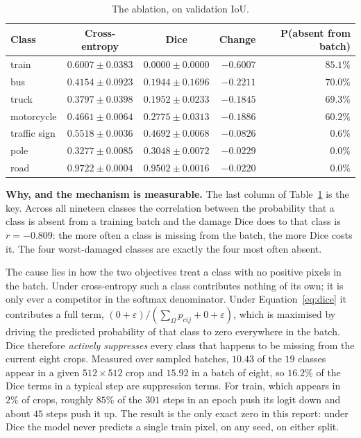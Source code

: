\begin{table}[H]
\centering
\caption{The ablation, on validation IoU.}
\label{tab:ablation}
\small
\begin{tabular}{lccrr}
\hline
\textbf{Class} & \textbf{Cross-entropy} & \textbf{Dice} & \textbf{Change} & \textbf{P(absent from batch)} \\
\hline
train         & $0.6007 \pm 0.0383$ & $0.0000 \pm 0.0000$ & $-0.6007$ & $85.1\%$ \\
bus           & $0.4154 \pm 0.0923$ & $0.1944 \pm 0.1696$ & $-0.2211$ & $70.0\%$ \\
truck         & $0.3797 \pm 0.0398$ & $0.1952 \pm 0.0233$ & $-0.1845$ & $69.3\%$ \\
motorcycle    & $0.4661 \pm 0.0064$ & $0.2775 \pm 0.0313$ & $-0.1886$ & $60.2\%$ \\
\hline
traffic sign  & $0.5518 \pm 0.0036$ & $0.4692 \pm 0.0068$ & $-0.0826$ & $0.6\%$ \\
pole          & $0.3277 \pm 0.0085$ & $0.3048 \pm 0.0072$ & $-0.0229$ & $0.0\%$ \\
road          & $0.9722 \pm 0.0004$ & $0.9502 \pm 0.0016$ & $-0.0220$ & $0.0\%$ \\
\hline
\end{tabular}
\end{table}

\textbf{Why, and the mechanism is measurable.} The last column of Table~\ref{tab:ablation} is
the key. Across all nineteen classes the correlation between the probability that a class is
absent from a training batch and the damage Dice does to that class is $r = -0.809$: the more
often a class is missing from the batch, the more Dice costs it. The four worst-damaged classes
are exactly the four most often absent.

The cause lies in how the two objectives treat a class with no positive pixels in the batch.
Under cross-entropy such a class contributes nothing of its own; it is only ever a competitor in
the softmax denominator. Under Equation~\ref{eq:dice} it contributes a full term,
$(0 + \varepsilon) / (\sum_\Omega p_{cij} + 0 + \varepsilon)$, which is maximised by driving the
predicted probability of that class to zero everywhere in the batch. Dice therefore \emph{actively
suppresses} every class that happens to be missing from the current eight crops. Measured over
sampled batches, $10.43$ of the $19$ classes appear in a given $512 \times 512$ crop and $15.92$
in a batch of eight, so $16.2\%$ of the Dice terms in a typical step are suppression terms. For
train, which appears in $2\%$ of crops, roughly $85\%$ of the $301$ steps in an epoch push its
logit down and about $45$ steps push it up. The result is the only exact zero in this report:
under Dice the model never predicts a single train pixel, on any seed, on either split.

